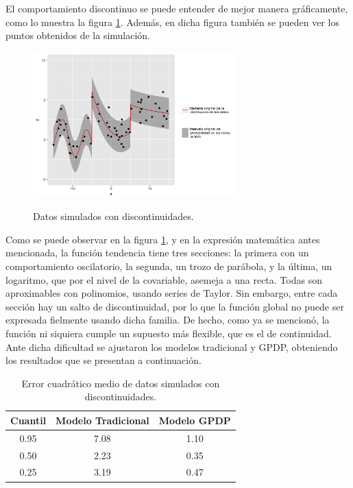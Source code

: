 El comportamiento discontinuo se puede entender de mejor manera gr\'aficamente, como lo muestra la figura \ref{sample_discontinuous}. Adem\'as, en dicha figura tambi\'en se pueden ver los puntos obtenidos de la simulaci\'on.

\begin{figure}[H]
	\centering
	\caption{Datos simulados con discontinuidades.}
	\includegraphics[width=0.7\textwidth]{Figures/Simulation/discontinuous/sample.png}
	\label{sample_discontinuous}
\end{figure}

Como se puede observar en la figura \ref{sample_discontinuous}, y en la expresi\'on matem\'atica antes mencionada, la funci\'on tendencia tiene tres secciones: la primera con un comportamiento oscilatorio, la segunda, un trozo de par\'abola, y la \'ultima, un logaritmo, que por el nivel de la covariable, asemeja a una recta. Todas son aproximables con polinomios, usando series de Taylor. Sin embargo, entre cada secci\'on hay un salto de discontinuidad, por lo que la funci\'on global no puede ser expresada fielmente usando dicha familia. De hecho, como ya se mencion\'o, la funci\'on ni siquiera cumple un supuesto m\'as flexible, que es el de continuidad. Ante dicha dificultad se ajustaron los modelos tradicional y GPDP, obteniendo los resultados que se presentan a continuaci\'on. 

\begin{table}[H]
\centering
\caption{Error cuadrático medio de datos simulados con discontinuidades.} 
\begin{tabular}{ccc}
  \hline
Cuantil & Modelo Tradicional & Modelo GPDP \\ 
  \hline
0.95 & 7.08 & 1.10 \\ 
  0.50 & 2.23 & 0.35 \\ 
  0.25 & 3.19 & 0.47 \\ 
   \hline
\end{tabular}
\label{mse_discontinuous}
\end{table}

